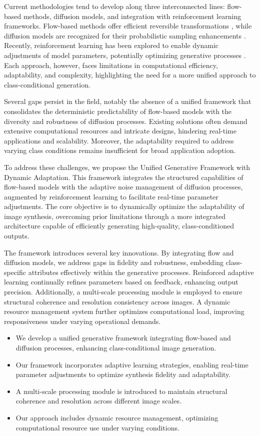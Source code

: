 \documentclass{article} %
\begin{document}
Current methodologies tend to develop along three interconnected lines: flow-based methods, diffusion models, and integration with reinforcement learning frameworks. Flow-based methods offer efficient reversible transformations \citep{dinh2016density}, while diffusion models are recognized for their probabilistic sampling enhancements \citep{ho2020denoising}. Recently, reinforcement learning has been explored to enable dynamic adjustments of model parameters, potentially optimizing generative processes \citep{ren2023reinforcement}. Each approach, however, faces limitations in computational efficiency, adaptability, and complexity, highlighting the need for a more unified approach to class-conditional generation.

Several gaps persist in the field, notably the absence of a unified framework that consolidates the deterministic predictability of flow-based models with the diversity and robustness of diffusion processes. Existing solutions often demand extensive computational resources and intricate designs, hindering real-time applications and scalability. Moreover, the adaptability required to address varying class conditions remains insufficient for broad application adoption.

To address these challenges, we propose the Unified Generative Framework with Dynamic Adaptation. This framework integrates the structured capabilities of flow-based models with the adaptive noise management of diffusion processes, augmented by reinforcement learning to facilitate real-time parameter adjustments. The core objective is to dynamically optimize the adaptability of image synthesis, overcoming prior limitations through a more integrated architecture capable of efficiently generating high-quality, class-conditioned outputs.

The framework introduces several key innovations. By integrating flow and diffusion models, we address gaps in fidelity and robustness, embedding class-specific attributes effectively within the generative processes. Reinforced adaptive learning continually refines parameters based on feedback, enhancing output precision. Additionally, a multi-scale processing module is employed to ensure structural coherence and resolution consistency across images. A dynamic resource management system further optimizes computational load, improving responsiveness under varying operational demands.

\begin{itemize}
    \item We develop a unified generative framework integrating flow-based and diffusion processes, enhancing class-conditional image generation.
    \item Our framework incorporates adaptive learning strategies, enabling real-time parameter adjustments to optimize synthesis fidelity and adaptability.
    \item A multi-scale processing module is introduced to maintain structural coherence and resolution across different image scales.
    \item Our approach includes dynamic resource management, optimizing computational resource use under varying conditions.
\end{itemize}
\end{document}
